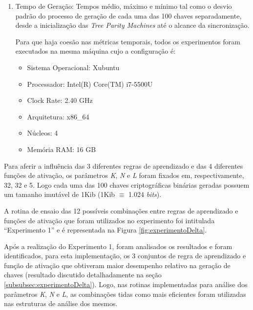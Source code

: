 \documentclass[12pt]{article}
\newcommand{\bits}{\textit{bits}\xspace}
\begin{document}
\begin{enumerate}
                \item Tempo de Geração:
                    Tempos médio, máximo e mínimo tal como o desvio padrão do processo de geração de cada uma das 100 chaves separadamente, desde a inicialização das \textit{Tree Parity Machines} até o alcance da sincronização.
                    
                    Para que haja coesão nas métricas temporais, todos os experimentos foram executados na mesma máquina cujo a configuração é:
                    
                    \begin{itemize}
                        \item Sistema Operacional: Xubuntu
                        \item Processador: Intel(R) Core(TM) i7-5500U
                        \item Clock Rate: 2.40 GHz
                        \item Arquitetura: x86\_64
                        \item Núcleos: 4
                        \item Memória RAM: 16 GB
                    \end{itemize}

            \end{enumerate}

            Para aferir a influência das 3 diferentes regras de aprendizado e das 4 diferentes funções de ativação, os parâmetros \textit{K}, \textit{N} e \textit{L} foram fixados em, respectivamente, 32, 32 e 5. Logo cada uma das 100 chaves criptográficas binárias geradas possuem um tamanho imutável de 1Kib (1Kib $\equiv$ 1.024 \bits).
            
            A rotina de ensaio das 12 possíveis combinações entre regras de aprendizado e funções de ativação que foram utilizados no experimento foi intitulada ``Experimento 1'' e é representada na Figura \ref{fig:experimentoDelta}.

            

            Após a realização do Experimento 1, foram analisados os resultados e foram identificados, para esta implementação, os 3 conjuntos de regra de aprendizado e função de ativação que obtiveram maior desempenho relativo na geração de chaves (resultado discutido detalhadamente na seção \ref{subsubsec:experimentoDelta}). Logo, nas rotinas implementadas para análise dos parâmetros \textit{K}, \textit{N} e \textit{L}, as combinações tidas como mais eficientes foram utilizadas nas estruturas de análise dos mesmos.
\end{document}
